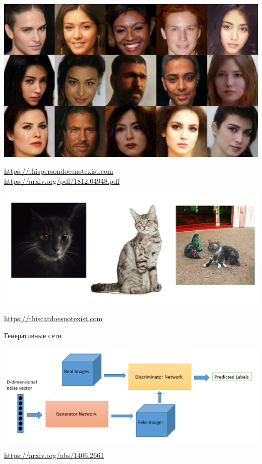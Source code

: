 \documentclass[notes,12pt, aspectratio=169]{beamer}
\begin{document}
\begin{frame}
\begin{center}
	\includegraphics[width=.8\linewidth]{face_teaser.png}
\end{center}
\vfill
\footnotesize
{\color{blue} \url{https://thispersondoesnotexist.com} \\ 
\url{https://arxiv.org/pdf/1812.04948.pdf}}
\end{frame}


\begin{frame}
\begin{center}
	\includegraphics[width=.9\linewidth]{cat_teaser.png}
\end{center}
\vfill
\footnotesize
{\color{blue} \url{https://thiscatdoesnotexist.com}}
\end{frame}


\begin{frame}{Генеративные сети}
\begin{center}
	\includegraphics[width=.95\linewidth]{gan1.png}
\end{center}
\vfill
\footnotesize
{\color{blue} \url{https://arxiv.org/abs/1406.2661}}
\end{frame}
\end{document}
